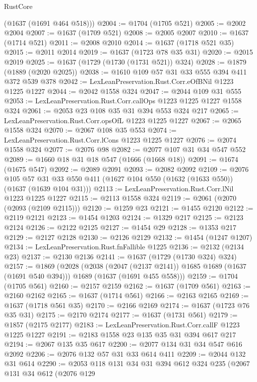 \begin{lexlean}{RustCore}
\begin{coremodule}
      (@1637 (@1691 @464 @518)))
@2004 := @1704 (@1705 @521)
@2005 := @2002 @2004
@2007 := @1637 (@1709 @521)
@2008 := @2005 @2007
@2010 := @1637 (@1714 @521)
@2011 := @2008 @2010
@2014 := @1637 (@1718 @521 @35)
@2015 := @2011 @2014
@2019 := @1637 (@1723 @78 @35 @31)
@2020 := @2015 @2019
@2025 := @1637 (@1729 (@1730 (@1731 @521)) @324)
@2028 := @1879 (@1889 (@2020 @2025))
@2038 := @1610 @109 @57 @31 @33 @555 @394 @411 @372 @539 @378
@2042 := LexLeanPreservation.Rust.Corr.eOfBNil @1223 @1225 @1227
@2044 := @2042 @1558 @324
@2047 := @2044 @109 @31 @555
@2053 := LexLeanPreservation.Rust.Corr.callOps @1223 @1225 @1227 @1558 @324
@2061 := @2053 @23 @108 @35 @31 @394 @553 @324 @217
@2065 := LexLeanPreservation.Rust.Corr.opsOfL @1223 @1225 @1227
@2067 := @2065 @1558 @324
@2070 := @2067 @108 @35 @553
@2074 := LexLeanPreservation.Rust.Corr.lCons @1223 @1225 @1227
@2076 := @2074 @1558 @324
@2077 := @2076 @98
@2082 := @2077 @107 @31 @34 @547 @552
@2089 := @1660 @18 @31 @18 @547 (@1666 (@1668 @18))
@2091 := @1674 (@1675 @547)
@2092 := @2089 @2091
@2093 := @2082 @2092
@2109 := @2076
    @105
    @57
    @31
    @33
    @550
    @411
    (@1627 @104 @550 (@1632 (@1633 @550)) (@1637 (@1639 @104 @31)))
@2113 := LexLeanPreservation.Rust.Corr.lNil @1223 @1225 @1227
@2115 := @2113 @1558 @324
@2119 := @2061 (@2070 (@2093 (@2109 @2115)))
@2120 := @1259 @23
@2121 := @1455 @2120
@2122 := @2119 @2121
@2123 := @1454 @1203
@2124 := @1329 @217
@2125 := @2123 @2124
@2126 := @2122 @2125
@2127 := @1454 @29
@2128 := @1353 @217
@2129 := @2127 @2128
@2130 := @2126 @2129
@2132 := @1454 (@1247 @1207)
@2134 := LexLeanPreservation.Rust.fnFallible @1225
@2136 := @2132 (@2134 @23)
@2137 := @2130 @2136
@2141 := @1637 (@1729 (@1730 @324) @324)
@2157 := @1869
    (@2028
      (@2038 (@2047 (@2137 @2141)) @1685 @1689 (@1637 (@1691 @540 @394)))
      @1689
      (@1637 (@1691 @455 @558)))
@2159 := @1704 (@1705 @561)
@2160 := @2157 @2159
@2162 := @1637 (@1709 @561)
@2163 := @2160 @2162
@2165 := @1637 (@1714 @561)
@2166 := @2163 @2165
@2169 := @1637 (@1718 @561 @35)
@2170 := @2166 @2169
@2174 := @1637 (@1723 @76 @35 @31)
@2175 := @2170 @2174
@2177 := @1637 (@1731 @561)
@2179 := @1857 (@2175 @2177)
@2183 := LexLeanPreservation.Rust.Corr.callF @1223 @1225 @1227
@2191 := @2183 @1558 @23 @135 @35 @31 @394 @617 @217
@2194 := @2067 @135 @35 @617
@2200 := @2077 @134 @31 @34 @547 @616 @2092
@2206 := @2076 @132 @57 @31 @33 @614 @411
@2209 := @2044 @132 @31 @614
@2290 := @2053
    @118
    @131
    @34
    @31
    @394
    @612
    @324
    @235
    (@2067
      @131
      @34
      @612
      (@2076
        @129

\end{coremodule}
\end{lexlean}
